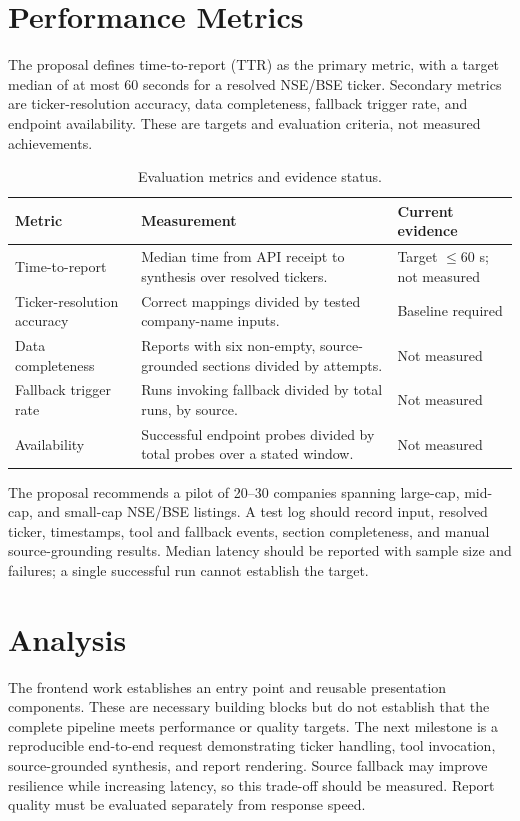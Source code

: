 \documentclass[12pt,a4paper,oneside]{report}
\begin{document}
\section{Performance Metrics}
The proposal defines time-to-report (TTR) as the primary metric, with a target median of at most 60 seconds for a resolved NSE/BSE ticker. Secondary metrics are ticker-resolution accuracy, data completeness, fallback trigger rate, and endpoint availability. These are targets and evaluation criteria, not measured achievements.
\begin{table}[H]\centering\small
\begin{tabularx}{\textwidth}{>{\raggedright\arraybackslash}p{3cm}X>{\raggedright\arraybackslash}p{3cm}}
\toprule \textbf{Metric} & \textbf{Measurement} & \textbf{Current evidence}\\\midrule
Time-to-report & Median time from API receipt to synthesis over resolved tickers. & Target $\leq 60$ s; not measured\\
Ticker-resolution accuracy & Correct mappings divided by tested company-name inputs. & Baseline required\\
Data completeness & Reports with six non-empty, source-grounded sections divided by attempts. & Not measured\\
Fallback trigger rate & Runs invoking fallback divided by total runs, by source. & Not measured\\
Availability & Successful endpoint probes divided by total probes over a stated window. & Not measured\\
\bottomrule
\end{tabularx}
\caption{Evaluation metrics and evidence status.}
\label{tab:metrics}
\end{table}
The proposal recommends a pilot of 20--30 companies spanning large-cap, mid-cap, and small-cap NSE/BSE listings. A test log should record input, resolved ticker, timestamps, tool and fallback events, section completeness, and manual source-grounding results. Median latency should be reported with sample size and failures; a single successful run cannot establish the target.

\section{Analysis}
The frontend work establishes an entry point and reusable presentation components. These are necessary building blocks but do not establish that the complete pipeline meets performance or quality targets. The next milestone is a reproducible end-to-end request demonstrating ticker handling, tool invocation, source-grounded synthesis, and report rendering. Source fallback may improve resilience while increasing latency, so this trade-off should be measured. Report quality must be evaluated separately from response speed.
\end{document}
